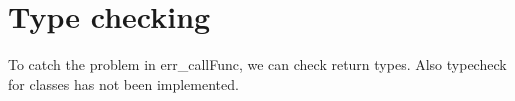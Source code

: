 \section{Type checking}
To catch the problem in err\_callFunc, we can check return types. Also typecheck for classes has not been implemented.


